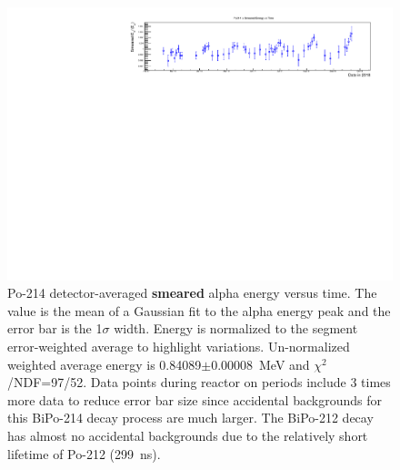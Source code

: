 \begin{figure}[!h]
\centering
\includegraphics[width=1.05\textwidth]{figures/PubBiPo214EsmearvsT.pdf}
\caption{\label{fig:EsmearvsT214}Po-214 detector-averaged {\bf smeared} alpha energy versus time. The value is the mean of a Gaussian fit to the alpha energy peak and the error bar is the 1$\sigma$ width. Energy is normalized to the segment error-weighted average to highlight variations. Un-normalized weighted average energy is 0.84089$\pm$0.00008~MeV and $\chi^2$/NDF=97/52. Data points during reactor on periods include 3 times more data to reduce error bar size since accidental backgrounds for this BiPo-214 decay process are much larger. The BiPo-212 decay has almost no accidental backgrounds due to the relatively short lifetime of Po-212 (299~ns).}
\end{figure}
\FloatBarrier
\newpage
